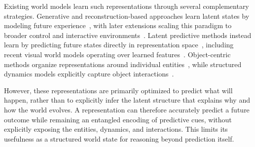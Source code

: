 \documentclass{article}
\begin{document}
Existing world models learn such representations through several complementary strategies.
Generative and reconstruction-based approaches learn latent states by modeling future experience~\citep{ha2018worldmodels,hafner2019planet,hafner2020dreamer}, with later extensions scaling this paradigm to broader control and interactive environments~\citep{hafner2023dreamerv3,bruce2024genie}.
Latent predictive methods instead learn by predicting future states directly in representation space~\citep{assran2023ijepa,bardes2024vjepa,assran2025vjepa2}, including recent visual world models operating over learned features~\citep{zhou2025dinowm,wang2026internvideonext}.
Object-centric methods organize representations around individual entities~\citep{locatello2020slotattention,kipf2022savi,seitzer2023dinosaurs}, while structured dynamics models explicitly capture object interactions~\citep{wu2022slotformer,battaglia2016interaction,kipf2018nri,lin2020cswm}.



However, these representations are primarily optimized to predict what will happen, rather than to explicitly infer the latent structure that explains why and how the world evolves.
A representation can therefore accurately predict a future outcome while remaining an entangled encoding of predictive cues, without explicitly exposing the entities, dynamics, and interactions.
This limits its usefulness as a structured world state for reasoning beyond prediction itself.
\end{document}
